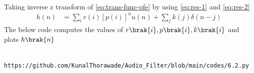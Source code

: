 \documentclass[journal,12pt,twocolumn]{IEEEtran}
\theoremstyle{remark}
\begin{document}
\begin{enumerate}[label=\thesection.\arabic*]
\begin{align}
																																																																																												\end{align}
																																																																																												Taking inverse z transform of \eqref{eq:trans-func-pfe} by using \eqref{eq:res-1} and \eqref{eq:res-2}
																																																																																												\begin{align}
																																																																																												h(n) &= \sum_{i}r(i)[p(i)]^nu(n) + \sum_{j}k(j)\delta(n - j)
																																																																																													\label{eq:h-n-expr}
																																																																																													\end{align}
																																																																																													The below code computes the values of $r\brak{i},p\brak{i} , k\brak{i}$ and plots $h\brak{n}$
																																																																																													\begin{lstlisting}
																																																																																													https://github.com/KunalThorawade/Audio_Filter/blob/main/codes/6.2.py
																																																																																													\end{lstlisting}


\end{enumerate}
\end{document}
